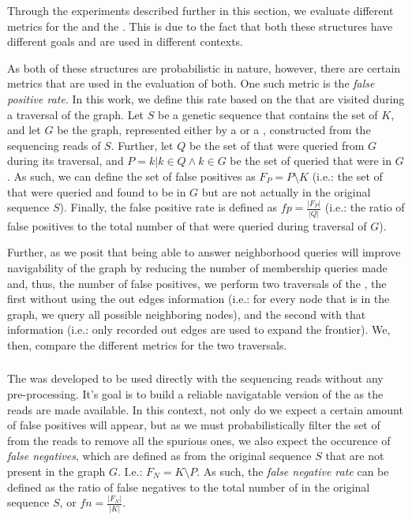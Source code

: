 Through the experiments described further in this section, we evaluate different metrics for the \dBCM and the \dBHT. This is due to
the fact that both these structures have different goals and are used in different contexts.

As both of these structures are probabilistic in nature, however, there are certain metrics that are used in the evaluation of both.
One such metric is the \emph{false positive rate}. In this work, we define this rate based on the \kmers that are visited during a 
traversal of the graph. Let $S$ be a genetic sequence that contains the set of \kmers $K$, and let $G$ be the graph, represented
either by a \dBCM or a \dBHT, constructed from the sequencing reads of $S$. Further, let $Q$ be the set of \kmers that were queried
from $G$ during its traversal, and $P={k | k \in Q \wedge k \in G}$ be the set of queried \kmers that were in $G$. As such, we can
define the set of false positives as $F_P=P \setminus K$ (i.e.: the set of \kmers that were queried and found to be in $G$ but are not
actually in the original sequence $S$). Finally, the false positive rate is defined as $fp=\frac{|F_P|}{|Q|}$ (i.e.: the ratio of false
positives to the total number of \kmers that were queried during traversal of $G$).


Further, as we posit that being able to answer neighborhood queries will improve navigability of the graph by reducing the number of
membership queries made and, thus, the number of false positives, we perform two traversals of the \dBG, the first without using the
out edges information (i.e.: for every node that is in the graph, we query all possible neighboring nodes), and the second with that
information (i.e.: only recorded out edges are used to expand the frontier). We, then, compare the different metrics for the two
traversals.

\subsubsection{\dBCM}

The \dBCM was developed to be used directly with the sequencing reads without any pre-processing. It's goal is to build a reliable
navigatable version of the \dBG as the reads are made available. In this context, not only do we expect a certain amount of false
positives will appear, but as we must probabilistically filter the set of \kmers from the reads to remove all the spurious ones, we
also expect the occurence of \emph{false negatives}, which are defined as \kmers from the original sequence $S$ that are not present
in the graph $G$. I.e.: $F_N=K \setminus P$. As such, the \emph{false negative rate} can be defined as the ratio of false negatives
to the total number of \kmers in the original sequence $S$, or $fn=\frac{|F_N|}{|K|}$.

